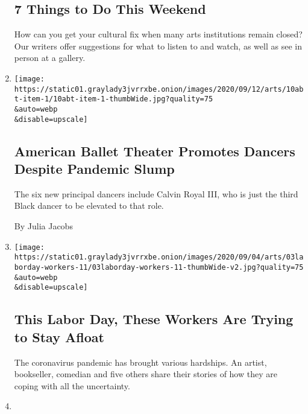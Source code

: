 \begin{enumerate}
  \hypertarget{7-things-to-do-this-weekend}{%
  \subsection{7 Things to Do This
  Weekend}\label{7-things-to-do-this-weekend}}

  How can you get your cultural fix when many arts institutions remain
  closed? Our writers offer suggestions for what to listen to and watch,
  as well as see in person at a gallery.
\item
  \href{/2020/09/10/arts/dance/american-ballet-theater-promotions-pandemic.html}{}

  \texttt{[image: https://static01.graylady3jvrrxbe.onion/images/2020/09/12/arts/10abt-item-1/10abt-item-1-thumbWide.jpg?quality=75\\\&auto=webp\\\&disable=upscale]}

  \hypertarget{american-ballet-theater-promotes-dancers-despite-pandemic-slump}{%
  \subsection{American Ballet Theater Promotes Dancers Despite Pandemic
  Slump}\label{american-ballet-theater-promotes-dancers-despite-pandemic-slump}}

  The six new principal dancers include Calvin Royal III, who is just
  the third Black dancer to be elevated to that role.

  By Julia Jacobs
\item
  \href{/2020/09/04/arts/labor-day-workers-arts-coronavirus.html}{}

  \texttt{[image: https://static01.graylady3jvrrxbe.onion/images/2020/09/04/arts/03laborday-workers-11/03laborday-workers-11-thumbWide-v2.jpg?quality=75\\\&auto=webp\\\&disable=upscale]}

  \hypertarget{this-labor-day-these-workers-are-trying-to-stay-afloat}{%
  \subsection{This Labor Day, These Workers Are Trying to Stay
  Afloat}\label{this-labor-day-these-workers-are-trying-to-stay-afloat}}

  The coronavirus pandemic has brought various hardships. An artist,
  bookseller, comedian and five others share their stories of how they
  are coping with all the uncertainty.
\item
  \href{/2020/09/03/arts/things-to-do-weekend-coronavirus.html}{}


\end{enumerate}
